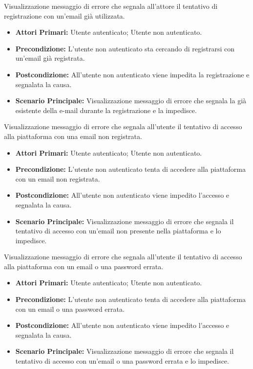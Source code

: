 Visualizzazione messaggio di errore che segnala all'attore il tentativo di registrazione con un'email già utilizzata.
\begin{itemize}
    \item \textbf{Attori Primari:} Utente autenticato; Utente non autenticato.
    \item \textbf{Precondizione:} L'utente non autenticato sta cercando di registrarsi con un'email già registrata.
    \item \textbf{Postcondizione:} All'utente non autenticato viene impedita la registrazione e segnalata la causa.
    \item \textbf{Scenario Principale:} Visualizzazione messaggio di errore che segnala la già esistente della e-mail durante la registrazione e la impedisce.
\end{itemize}

Visualizzazione messaggio di errore che segnala all'utente il tentativo di accesso alla piattaforma con una email non registrata.
\begin{itemize}
    \item \textbf{Attori Primari:} Utente autenticato; Utente non autenticato.
    \item \textbf{Precondizione:} L'utente non autenticato tenta di accedere alla piattaforma con un email non registrata.
    \item \textbf{Postcondizione:} All'utente non autenticato viene impedito l'accesso e segnalata la causa.
    \item \textbf{Scenario Principale:} Visualizzazione messaggio di errore che segnala il tentativo di accesso con un'email non presente nella piattaforma e lo impedisce.
\end{itemize}

Visualizzazione messaggio di errore che segnala all'utente il tentativo di accesso alla piattaforma con un email o una password errata.
\begin{itemize}
    \item \textbf{Attori Primari:} Utente autenticato; Utente non autenticato.
    \item \textbf{Precondizione:} L'utente non autenticato tenta di accedere alla piattaforma con un email o una password errata.
    \item \textbf{Postcondizione:} All'utente non autenticato viene impedito l'accesso e segnalata la causa.
    \item \textbf{Scenario Principale:} Visualizzazione messaggio di errore che segnala il tentativo di accesso con un'email o una password errata e lo impedisce.
\end{itemize}

